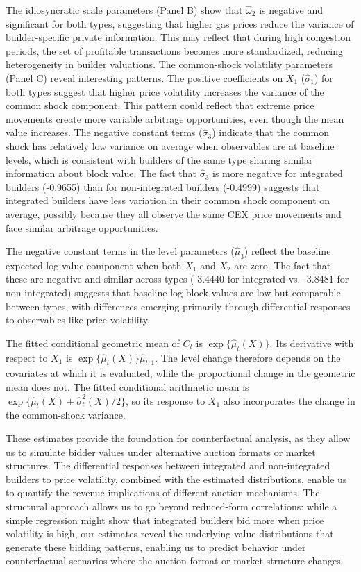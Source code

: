 \documentclass[12pt,reqno]{amsart}
\begin{document}
The idiosyncratic scale parameters (Panel B) show that $\hat{\omega}_2$ is negative and significant for both types, suggesting that higher gas prices reduce the variance of builder-specific private information. This may reflect that during high congestion periods, the set of profitable transactions becomes more standardized, reducing heterogeneity in builder valuations.
The common-shock volatility parameters (Panel C) reveal interesting patterns. The positive coefficients on $X_1$ ($\hat{\sigma}_1$) for both types suggest that higher price volatility increases the variance of the common shock component. This pattern could reflect that extreme price movements create more variable arbitrage opportunities, even though the mean value increases. The negative constant terms ($\hat{\sigma}_3$) indicate that the common shock has relatively low variance on average when observables are at baseline levels, which is consistent with builders of the same type sharing similar information about block value. The fact that $\hat{\sigma}_3$ is more negative for integrated builders (-0.9655) than for non-integrated builders (-0.4999) suggests that integrated builders have less variation in their common shock component on average, possibly because they all observe the same CEX price movements and face similar arbitrage opportunities.

The negative constant terms in the level parameters ($\hat{\mu}_3$) reflect the baseline expected log value component when both $X_1$ and $X_2$ are zero. The fact that these are negative and similar across types (-3.4440 for integrated vs. -3.8481 for non-integrated) suggests that baseline log block values are low but comparable between types, with differences emerging primarily through differential responses to observables like price volatility.

The fitted conditional geometric mean of $C_t$ is $\exp\{\widehat\mu_t(X)\}$. Its derivative with respect to $X_1$ is $\exp\{\widehat\mu_t(X)\}\widehat\mu_{t,1}$. The level change therefore depends on the covariates at which it is evaluated, while the proportional change in the geometric mean does not. The fitted conditional arithmetic mean is $\exp\{\widehat\mu_t(X)+\widehat\sigma_t^2(X)/2\}$, so its response to $X_1$ also incorporates the change in the common-shock variance.

These estimates provide the foundation for counterfactual analysis, as they allow us to simulate bidder values under alternative auction formats or market structures. The differential responses between integrated and non-integrated builders to price volatility, combined with the estimated distributions, enable us to quantify the revenue implications of different auction mechanisms. The structural approach allows us to go beyond reduced-form correlations: while a simple regression might show that integrated builders bid more when price volatility is high, our estimates reveal the underlying value distributions that generate these bidding patterns, enabling us to predict behavior under counterfactual scenarios where the auction format or market structure changes.
\end{document}
